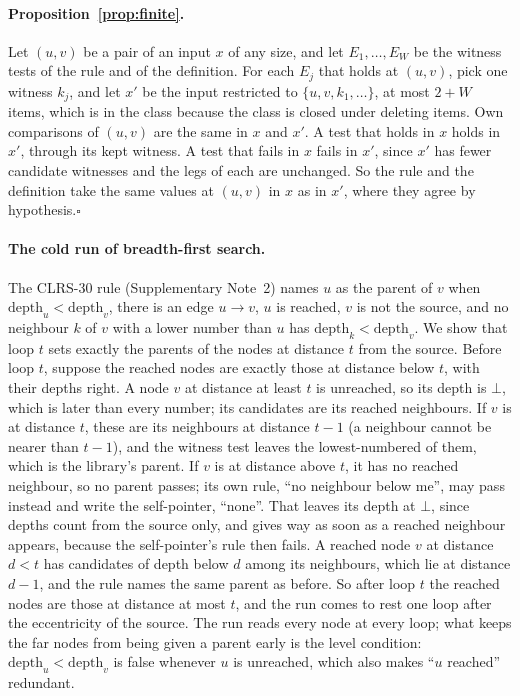 \documentclass[10pt]{article}
\newcommand{\notyet}{\bot}
\begin{document}
\paragraph{Proposition~\ref{prop:finite}.} Let $(u,v)$ be a pair of an input $x$ of any size, and let $E_1,\ldots,E_W$ be
the witness tests of the rule and of the definition. For each $E_j$ that holds at $(u,v)$, pick one witness $k_j$, and let
$x'$ be the input restricted to $\{u,v,k_1,\ldots\}$, at most $2+W$ items, which is in the class because the class is
closed under deleting items. Own comparisons of $(u,v)$ are the same in $x$ and $x'$. A test that holds in $x$ holds in
$x'$, through its kept witness. A test that fails in $x$ fails in $x'$, since $x'$ has fewer candidate witnesses and the
legs of each are unchanged. So the rule and the definition take the same values at $(u,v)$ in $x$ as in $x'$, where they
agree by hypothesis.\hfill$\square$

\paragraph{The cold run of breadth-first search.} The CLRS-30 rule (Supplementary Note~2) names $u$ as the parent of $v$
when $\mathrm{depth}_u < \mathrm{depth}_v$, there is an edge $u \to v$, $u$ is reached, $v$ is not the source, and no
neighbour $k$ of $v$ with a lower number than $u$ has $\mathrm{depth}_k < \mathrm{depth}_v$. We show that loop $t$ sets
exactly the parents of the nodes at distance $t$ from the source. Before loop $t$, suppose the reached nodes are exactly
those at distance below $t$, with their depths right. A node $v$ at distance at least $t$ is unreached, so its depth is
$\notyet$, which is later than every number; its candidates are its reached neighbours. If $v$ is at distance $t$, these
are its neighbours at distance $t-1$ (a neighbour cannot be nearer than $t-1$), and the witness test leaves the
lowest-numbered of them, which is the library's parent. If $v$ is at distance above $t$, it has no reached neighbour, so
no parent passes; its own rule, ``no neighbour below me'', may pass instead and write the self-pointer, ``none''. That
leaves its depth at $\notyet$, since depths count from the source only, and gives way as soon as a reached neighbour
appears, because the self-pointer's rule then fails. A reached node $v$ at distance $d < t$ has candidates of depth below $d$ among
its neighbours, which lie at distance $d-1$, and the rule names the same parent as before. So after loop $t$ the reached
nodes are those at distance at most $t$, and the run comes to rest one loop after the eccentricity of the source.
The run reads every node at every loop; what keeps the far nodes from being given a parent early is the level condition:
$\mathrm{depth}_u < \mathrm{depth}_v$ is false whenever $u$ is unreached, which also makes ``$u$ reached'' redundant.
\end{document}
